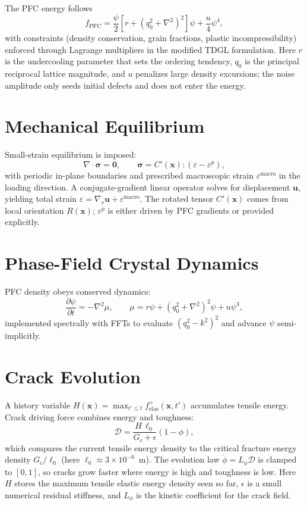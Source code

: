 \documentclass[11pt]{article}
\begin{document}
The PFC energy follows
\begin{equation}
f_{\text{PFC}} = \frac{\psi}{2} \left[r + (q_0^2 + \nabla^2)^2 \right]\psi + \frac{u}{4} \psi^4,
\end{equation}
with constraints (density conservation, grain fractions, plastic incompressibility) enforced through Lagrange multipliers in the modified TDGL formulation. Here $r$ is the undercooling parameter that sets the ordering tendency, $q_0$ is the principal reciprocal lattice magnitude, and $u$ penalizes large density excursions; the noise amplitude only seeds initial defects and does not enter the energy.

\section{Mechanical Equilibrium}
Small-strain equilibrium is imposed:
\begin{equation}
\nabla\cdot \boldsymbol{\sigma} = \mathbf{0}, \qquad \boldsymbol{\sigma} = C'(\mathbf{x}) : (\varepsilon - \varepsilon^p),
\end{equation}
with periodic in-plane boundaries and prescribed macroscopic strain $\varepsilon^{\text{macro}}$ in the loading direction. A conjugate-gradient linear operator solves for displacement $\mathbf{u}$, yielding total strain $\varepsilon = \nabla_s \mathbf{u} + \varepsilon^{\text{macro}}$. The rotated tensor $C'(\mathbf{x})$ comes from local orientation $R(\mathbf{x})$; $\varepsilon^p$ is either driven by PFC gradients or provided explicitly.

\section{Phase-Field Crystal Dynamics}
PFC density obeys conserved dynamics:
\begin{equation}
\frac{\partial \psi}{\partial t} = -\nabla^2 \mu, \qquad \mu = r\psi + (q_0^2 + \nabla^2)^2 \psi + u \psi^3,
\end{equation}
implemented spectrally with FFTs to evaluate $(q_0^2 - k^2)^2$ and advance $\psi$ semi-implicitly.

\section{Crack Evolution}
A history variable $H(\mathbf{x}) = \max_{t'\leq t} f_{\text{elas}}^{+}(\mathbf{x},t')$ accumulates tensile energy. Crack driving force combines energy and toughness:
\begin{equation}
\mathcal{D} = \frac{H\,\ell_0}{G_c + \epsilon}(1 - \phi),
\end{equation}
which compares the current tensile energy density to the critical fracture energy density $G_c / \ell_0$ (here $\ell_0 \approx 3\times10^{-6}$~m). The evolution law $\dot{\phi} = L_\phi \mathcal{D}$ is clamped to $[0,1]$, so cracks grow faster where energy is high and toughness is low.
Here $H$ stores the maximum tensile elastic energy density seen so far, $\epsilon$ is a small numerical residual stiffness, and $L_\phi$ is the kinetic coefficient for the crack field.
\end{document}
